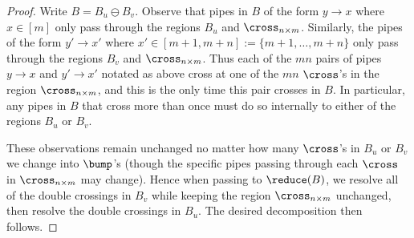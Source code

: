 \begin{proof}
    Write $B = B_u\ominus B_v$.
    Observe that pipes in $B$ of the form $y\to x$ where $x\in [m]$ only pass through the regions $B_u$ and $\cross_{n\times m}$.
    Similarly, the pipes of the form $y'\to x'$ where $x'\in [m+1,m+n] := \{m+1,\dots,m+n\}$ only pass through the regions $B_v$ and $\cross_{n\times m}$.
    Thus each of the $mn$ pairs of pipes $y\to x$ and $y'\to x'$ notated as above cross at one of the $mn$ $\cross$'s in the region $\cross_{n\times m}$, and this is the only time this pair crosses in $B$.
    In particular, any pipes in $B$ that cross more than once must do so internally to either of the regions $B_u$ or $B_v$.
    
    These observations remain unchanged no matter how many $\cross$'s in $B_u$ or $B_v$ we change into $\bump$'s (though the specific pipes passing through each $\cross$ in $\cross_{n\times m}$ may change).
    Hence when passing to $\reduce(B)$, we resolve all of the double crossings in $B_v$ while keeping the region $\cross_{n\times m}$ unchanged, then resolve the double crossings in $B_u$.
    The desired decomposition then follows.
\end{proof}

